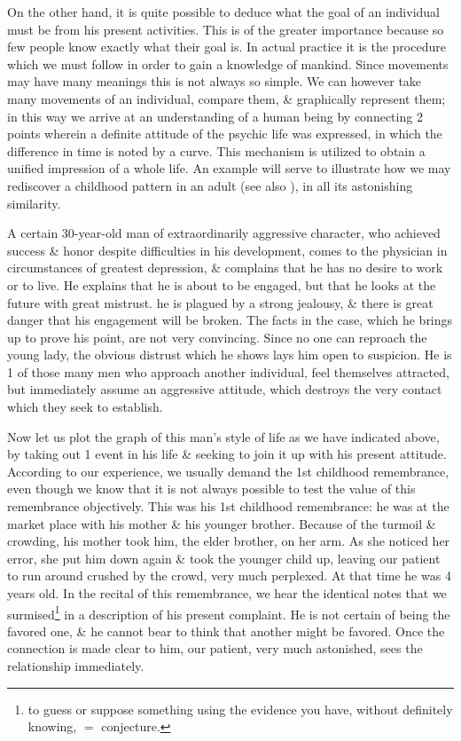 \documentclass{article}
\begin{document}
On the other hand, it is quite possible to deduce what the goal of an individual must be from his present activities. This is of the greater importance because so few people know exactly what their goal is. In actual practice it is the procedure which we must follow in order to gain a knowledge of mankind. Since movements may have many meanings this is not always so simple. We can however take many movements of an individual, compare them, \& graphically represent them; in this way we arrive at an understanding of a human being by connecting 2 points wherein a definite attitude of the psychic life was expressed, in which the difference in time is noted by a curve. This mechanism is utilized to obtain a unified impression of a whole life. An example will serve to illustrate how we may rediscover a childhood pattern in an adult (see also \cite{Giang_after_childhood}), in all its astonishing similarity.

A certain 30-year-old man of extraordinarily aggressive character, who achieved success \& honor despite difficulties in his development, comes to the physician in circumstances of greatest depression, \& complains that he has no desire to work or to live. He explains that he is about to be engaged, but that he looks at the future with great mistrust. he is plagued by a strong jealousy, \& there is great danger that his engagement will be broken. The facts in the case, which he brings up to prove his point, are not very convincing. Since no one can reproach the young lady, the obvious distrust which he shows lays him open to suspicion. He is 1 of those many men who approach another individual, feel themselves attracted, but immediately assume an aggressive attitude, which destroys the very contact which they seek to establish.

Now let us plot the graph of this man's style of life as we have indicated above, by taking out 1 event in his life \& seeking to join it up with his present attitude. According to our experience, we usually demand the 1st childhood remembrance, even though we know that it is not always possible to test the value of this remembrance objectively. This was his 1st childhood remembrance: he was at the market place with his mother \& his younger brother. Because of the turmoil \& crowding, his mother took him, the elder brother, on her arm. As she noticed her error, she put him down again \& took the younger child up, leaving our patient to run around crushed by the crowd, very much perplexed. At that time he was 4 years old. In the recital of this remembrance, we hear the identical notes that we surmised\footnote{to guess or suppose something using the evidence you have, without definitely knowing, $=$ conjecture.} in a description of his present complaint. He is not certain of being the favored one, \& he cannot bear to think that another might be favored. Once the connection is made clear to him, our patient, very much astonished, sees the relationship immediately.
\end{document}

